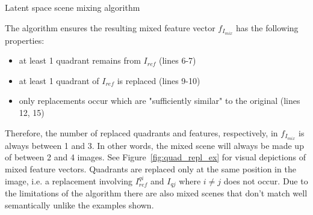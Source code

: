 \documentclass[12pt,a4paper]{article}
\begin{document}
\begin{algorithm}[H]
\DontPrintSemicolon
\LinesNumbered
{}
\caption{Latent space scene mixing algorithm}\label{alg:img_mixing_algo}
\end{algorithm}

The algorithm ensures the resulting mixed feature vector $f_{I_{mix}}$ has the following properties:
\begin{itemize}
   \item at least 1 quadrant remains from $I_{ref}$ (lines 6-7)
   \item at least 1 quadrant of $I_{ref}$ is replaced (lines 9-10)
   \item only replacements occur which are "sufficiently similar" to the original (lines 12, 15)
\end{itemize}
Therefore, the number of replaced quadrants and features, respectively, in $f_{I_{mix}}$ is always between 1 and 3. In other words, the mixed scene will always be made up of between 2 and 4 images. See Figure~\ref{fig:quad_repl_ex} for visual depictions of mixed feature vectors. Quadrants are replaced only at the same position in the image, i.e. a replacement involving $I^{qi}_{ref}$ and $I_{qj}$ where $i \neq j$ does not occur. Due to the limitations of the algorithm there are also mixed scenes that don't match well semantically unlike the examples shown.



\end{document}
